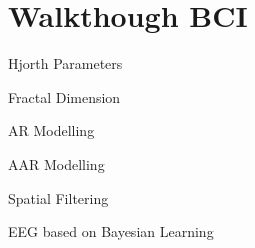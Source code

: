 \chapter{Walkthough BCI}

Hjorth Parameters

Fractal Dimension

AR Modelling

AAR Modelling

Spatial Filtering

EEG based on Bayesian Learning



